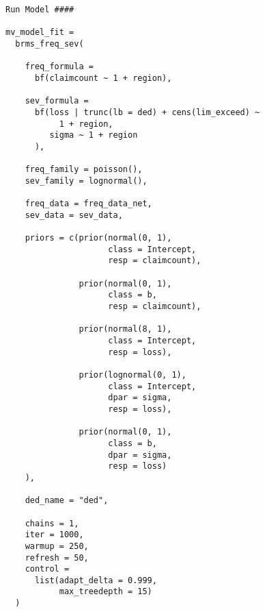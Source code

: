 \documentclass[
]{book}
\begin{document}
\begin{verbatim}
Run Model ####

mv_model_fit =
  brms_freq_sev(

    freq_formula =
      bf(claimcount ~ 1 + region),

    sev_formula =
      bf(loss | trunc(lb = ded) + cens(lim_exceed) ~
           1 + region,
         sigma ~ 1 + region
      ),

    freq_family = poisson(),
    sev_family = lognormal(),

    freq_data = freq_data_net,
    sev_data = sev_data,

    priors = c(prior(normal(0, 1),
                     class = Intercept,
                     resp = claimcount),

               prior(normal(0, 1),
                     class = b,
                     resp = claimcount),

               prior(normal(8, 1),
                     class = Intercept,
                     resp = loss),

               prior(lognormal(0, 1),
                     class = Intercept,
                     dpar = sigma,
                     resp = loss),

               prior(normal(0, 1),
                     class = b,
                     dpar = sigma,
                     resp = loss)
    ),

    ded_name = "ded",

    chains = 1,
    iter = 1000,
    warmup = 250,
    refresh = 50,
    control =
      list(adapt_delta = 0.999,
           max_treedepth = 15)
  )
\end{verbatim}

  
\end{document}
